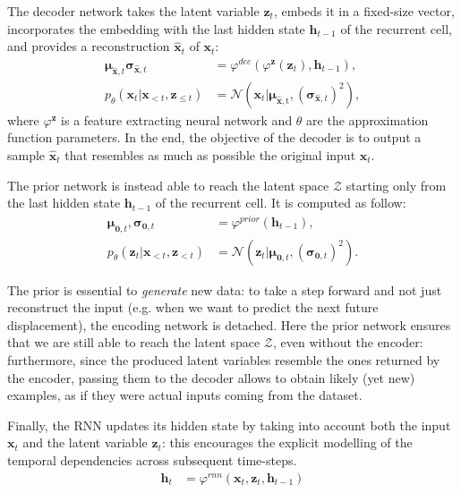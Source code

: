\documentclass[10pt,a4paper,conference]{IEEEtran}
\begin{document}
The decoder network takes the latent variable $\mathbf{z}_{t}$, embeds it in a fixed-size vector, incorporates the embedding with the last hidden state $\mathbf{h}_{t-1}$ of the recurrent cell, and provides a reconstruction $\mathbf{\hat{x}}_t$ of  $\mathbf{x}_t$:
\begin{align}
    \label{eq:vrnn_decoder}
    \pmb{\mu}_{\mathbf{\hat{x}},t} \pmb{\sigma}_{\mathbf{\hat{x}},t} &= \varphi^{dec}\left(\varphi^{\mathbf{z}}(\mathbf{z}_{t}), \mathbf{h}_{t-1}\right), \\
    \label{eq:vrnn_generation}
    p_{\theta}\left(\mathbf{x}_{t} | \mathbf{x}_{<t}, \mathbf{z}_{\leq t}\right) &= \mathcal{N}\left(\mathbf{x}_{t} | \boldsymbol{\mu}_{\mathrm{\mathbf{\hat{x}},t}},\left(\boldsymbol{\sigma}_{\mathbf{\hat{x}}, t}\right)^{2}\right),
\end{align}
where $\varphi^{\mathbf{z}}$ is a feature extracting neural network and $\theta$ are the approximation function parameters.
In the end, the objective of the decoder is to output a sample $\mathbf{\hat{x}}_{t}$ that resembles as much as possible the original input $\mathbf{x}_{t}$.

The prior network is instead able to reach the latent space $\mathcal{Z}$ starting only from the last hidden state $\mathbf{h}_{t-1}$ of the recurrent cell. It is computed as follow:
\begin{align}
  \label{eq:norm_prior_vrnn}
    \pmb{\mu}_{\mathbf{0},t}, \pmb{\sigma}_{\mathbf{0},t} &= \varphi^{prior}\left(\mathbf{h}_{t-1}\right), \\
    \label{eq:prior_vrnn}
    p_{\theta}\left(\mathbf{z}_{t} | \mathbf{x}_{<t}, \mathbf{z}_{<t}\right) &= \mathcal{N}\left(\mathbf{z}_{t} | \boldsymbol{\mu}_{\mathbf{0},t},\left(\boldsymbol{\sigma}_{\mathbf{0},t}\right)^{2}\right).
\end{align}

The prior is essential to \textit{generate} new data: to take a step forward and not just reconstruct the input (e.g. when we want to predict the next future displacement), the encoding network is detached. Here the prior network ensures that we are still able to reach the latent space $\mathcal{Z}$, even without the encoder: furthermore, since the produced latent variables resemble the ones returned by the encoder, passing them to the decoder allows to obtain likely (yet new) examples, as if they were actual inputs coming from the dataset.

Finally, the RNN updates its hidden state by taking into account both the input $\mathbf{x}_{t}$ and the latent variable $\mathbf{z}_{t}$: this encourages the explicit modelling of the temporal dependencies across subsequent time-steps.
\begin{align}
    \label{eq:vrnn_recurrence}
    \mathbf{h}_{t} &= \varphi^{rnn}\left(\mathbf{x}_{t}, \mathbf{z}_{t}, \mathbf{h}_{t-1}\right)
\end{align}
\end{document}
